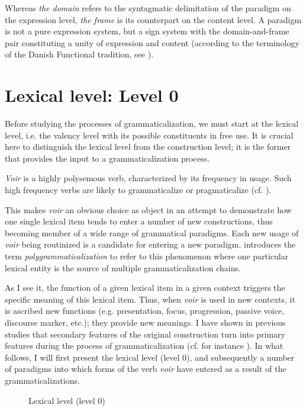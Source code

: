 \documentclass[output=paper]{langsci/langscibook}
\begin{document}
Whereas \textit{the domain} refers to the syntagmatic delimitation of the paradigm on the expression level, \textit{the frame} is its counterpart on the content level. A paradigm is not a pure expression system, but a sign system with the domain-and-frame pair constituting a unity of expression and content (according to the terminology of the Danish Functional tradition, see \citealt{Engberg-PedersenEtAl1996}).

\section{Lexical level: Level 0} \label{kragh:3}

Before studying the processes of grammaticalization, we must start at the lexical level, i.e. the valency level with its possible constituents in free use. It is crucial here to distinguish the lexical level from the construction level; it is the former that provides the input to a grammaticalization process.

\textit{Voir} is a highly polysemous verb, characterized by its frequency in usage. Such high frequency verbs are likely to grammaticalize or pragmaticalize (cf. \citealt[674--675]{Bolly2010}). 

This makes \textit{voir} an obvious choice as object in an attempt to demonstrate how one single lexical item tends to enter a number of new constructions, thus becoming member of a wide range of grammatical paradigms. Each new usage of \textit{voir} being routinized is a candidate for entering a new paradigm. \citet{Craig1991} introduces the term \textit{polygrammaticalization} to refer to this phenomenon where one particular lexical entity is the source of multiple grammaticalization chains.

As I see it, the function of a given lexical item in a given context triggers the specific meaning of this lexical item. Thus, when \textit{voir} is used in new contexts, it is ascribed new functions (e.g. presentation, focus, progression, passive voice, discourse marker, etc.); they provide new meanings. I have shown in previous studies that secondary features of the original construction turn into primary features during the process of grammaticalization (cf. for instance \citealt{KraghSchosler2015}). In what follows, I will first present the lexical level (level 0), and subsequently a number of paradigms into which forms of the verb \textit{voir} have entered as a result of the grammaticalizations.

\begin{figure}
 \caption{Lexical level (level 0)\label{fig:kragh:1}}
\end{figure}
\end{document}

